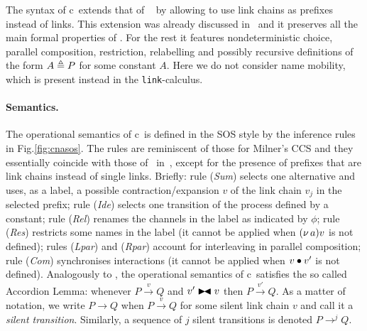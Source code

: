 The syntax of c\CNA\  extends that of \CNA~\cite{BBB17} by allowing to use link chains as prefixes instead of links.
This extension was already discussed in~\cite{BBB17} and it preserves all the main formal properties of \CNA. 
For the rest it features nondeterministic choice, parallel composition, restriction, relabelling and possibly recursive definitions of the form $A\triangleq P$ for some constant $A$. Here we do not consider name mobility, which is present instead in the {\tt link}-calculus.

\paragraph{Semantics.}

The operational semantics of c\CNA\ is defined in the SOS style by the inference rules in Fig.\ref{fig:cnasos}. The rules are reminiscent of those for Milner's CCS and they essentially coincide with those of \CNA\ in~\cite{BBB17}, except for the presence of prefixes that are link chains instead of single links.
Briefly: rule (\textit{Sum}) selects one alternative and uses, as a label, a possible contraction/expansion $v$ of the link chain $v_j$ in the selected prefix; rule (\textit{Ide}) selects one transition of the process defined by a constant; rule (\textit{Rel}) renames the channels in the label as indicated by $\phi$; rule (\textit{Res}) restricts some names in the label (it cannot be applied when $(\nu\, a)v$ is not defined); rules (\textit{Lpar}) and (\textit{Rpar}) account for interleaving in parallel composition; rule (\textit{Com}) 
synchronises interactions (it cannot be applied when $v \bullet v'$ is not defined).
%
Analogously to \CNA, the operational semantics of c\CNA\ satisfies the so called Accordion Lemma: whenever $P \xrightarrow{v} Q$ and $v'\blackstretcheq v$ then $P \xrightarrow{v'} Q$.
%
As a matter of notation, we write $P \rightarrow Q$ when $P \xrightarrow{v} Q$ for some silent link chain $v$ and call it a \emph{silent transition}. Similarly, a sequence of $j$ silent transitions is denoted $P \rightarrow^j Q$.





